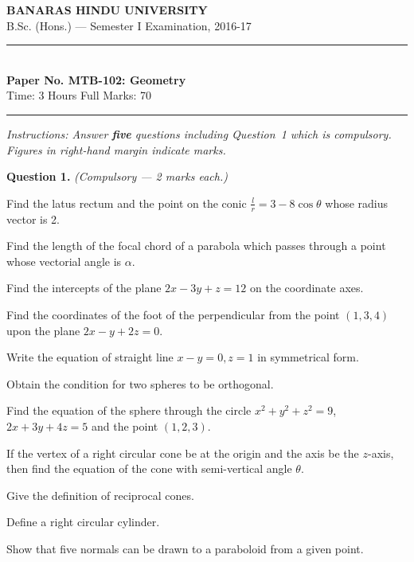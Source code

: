 \documentclass[11pt,a4paper]{article}
\begin{document}
\begin{center}
  {\large\bfseries BANARAS HINDU UNIVERSITY}\\[2pt]
  {\normalsize B.Sc. (Hons.) --- Semester I Examination, 2016-17}\\[6pt]
  \rule{0.8\linewidth}{0.5pt}\\[6pt]
  {\large\bfseries Paper No. MTB-102: Geometry}\\[4pt]
  {\normalsize Time: 3 Hours \hfill Full Marks: 70}
\end{center}
\rule{\linewidth}{0.4pt}
\smallskip



\noindent   \textit{Instructions: Answer   \textbf{five} questions including Question~1 which is compulsory. Figures in right-hand margin indicate marks.}
\bigskip




\noindent   \textbf{Question 1.}   \textit{(Compulsory --- 2 marks each.)}

\begin{parts}
  \item Find the latus rectum and the point on the conic $\frac{l}{r} = 3 - 8\cos \theta$ whose radius vector is 2.
  \item Find the length of the focal chord of a parabola which passes through a point whose vectorial angle is $\alpha$.
  \item Find the intercepts of the plane $2x - 3y + z = 12$ on the coordinate axes.
  \item Find the coordinates of the foot of the perpendicular from the point $(1, 3, 4)$ upon the plane $2x - y + 2z = 0$.
  \item Write the equation of straight line $x - y = 0, z = 1$ in symmetrical form.
  \item Obtain the condition for two spheres to be orthogonal.
  \item Find the equation of the sphere through the circle $x^2 + y^2 + z^2 = 9$, $2x + 3y + 4z = 5$ and the point $(1, 2, 3)$.
  \item If the vertex of a right circular cone be at the origin and the axis be the $z$-axis, then find the equation of the cone with semi-vertical angle $ \theta$.
  \item Give the definition of reciprocal cones.
  \item Define a right circular cylinder.
  \item Show that five normals can be drawn to a paraboloid from a given point.
\end{parts}
\end{document}
